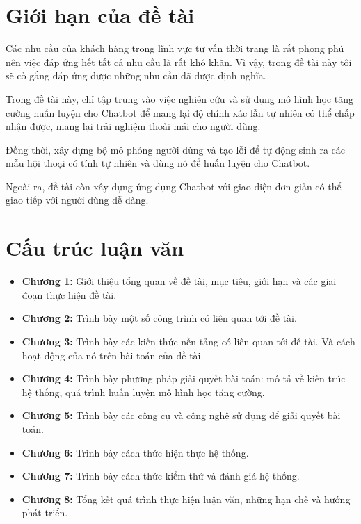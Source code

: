 \section{Giới hạn của đề tài}
\label{sec:scope}
Các nhu cầu của khách hàng trong lĩnh vực tư vấn thời trang là rất
phong phú nên việc đáp ứng hết tất cả nhu cầu là rất khó khăn.
Vì vậy, trong đề tài này tôi sẽ cố gắng đáp ứng được những
nhu cầu đã được định nghĩa.

Trong đề tài này, chỉ tập trung vào việc nghiên cứu và sử dụng mô hình
học tăng cường huấn luyện cho Chatbot để mang lại độ chính xác lẫn
tự nhiên có thể chấp nhận được, mang lại trải nghiệm thoải mái
cho người dùng.

Đồng thời, xây dựng bộ mô phỏng người dùng và tạo lỗi để tự động
sinh ra các mẫu hội thoại có tính tự nhiên và dùng nó để huấn luyện
cho Chatbot.

Ngoài ra, đề tài còn xây dựng ứng dụng Chatbot với giao diện đơn giản
có thể giao tiếp với người dùng dễ dàng.

\section{Cấu trúc luận văn}

\begin{itemize}
    \item \textbf{Chương 1:} Giới thiệu tổng quan về đề tài, mục tiêu,
    giới hạn và các giai đoạn thực hiện đề tài.
    \item \textbf{Chương 2:} Trình bày một số công trình có liên quan
    tới đề tài.
    \item \textbf{Chương 3:} Trình bày các kiến thức nền tảng có
    liên quan tới đề tài. Và cách hoạt động của nó trên bài toán
    của đề tài.
    \item \textbf{Chương 4:} Trình bày phương pháp giải quyết
    bài toán: mô tả về kiến trúc hệ thống, quá trình huấn luyện
    mô hình học tăng cường.
    \item \textbf{Chương 5:} Trình bày các công cụ và công nghệ
    sử dụng để giải quyết bài toán.
    \item \textbf{Chương 6:} Trình bày cách thức hiện thực hệ thống.
    \item \textbf{Chương 7:} Trình bày cách thức kiểm thử và
    đánh giá hệ thống.
    \item \textbf{Chương 8:} Tổng kết quá trình thực hiện luận văn,
    những hạn chế và hướng phát triển.
\end{itemize}
